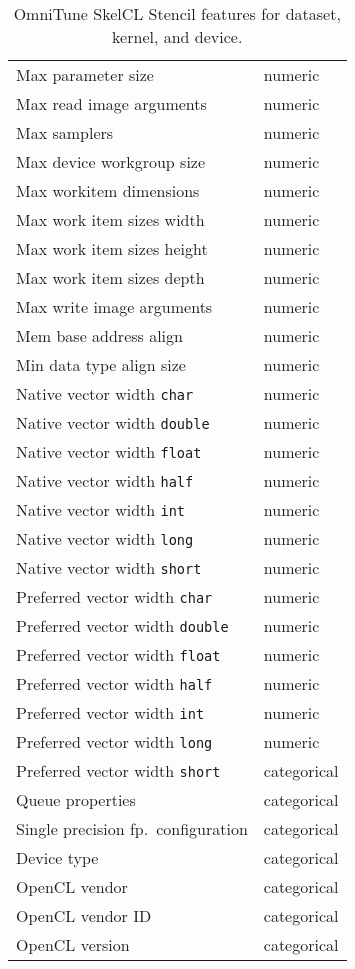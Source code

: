 \begin{table}
\begin{multicols}{2}
\begin{tabular}{p{4.5cm}p{1.3cm}}
      Max parameter size & numeric \\
      Max read image arguments & numeric \\
      Max samplers & numeric \\
      Max device workgroup size & numeric \\
      Max workitem dimensions & numeric \\
      Max work item sizes width & numeric \\
      Max work item sizes height & numeric \\
      Max work item sizes depth & numeric \\
      Max write image arguments & numeric \\
      Mem base address align & numeric \\
      Min data type align size & numeric \\
      Native vector width \texttt{char} & numeric \\
      Native vector width \texttt{double} & numeric \\
      Native vector width \texttt{float} & numeric \\
      Native vector width \texttt{half} & numeric \\
      Native vector width \texttt{int} & numeric \\
      Native vector width \texttt{long} & numeric \\
      Native vector width \texttt{short} & numeric \\
      Preferred vector width \texttt{char} & numeric \\
      Preferred vector width \texttt{double} & numeric \\
      Preferred vector width \texttt{float} & numeric \\
      Preferred vector width \texttt{half} & numeric \\
      Preferred vector width \texttt{int} & numeric \\
      Preferred vector width \texttt{long} & numeric \\
      Preferred vector width \texttt{short} & categorical \\
      Queue properties & categorical \\
      Single precision fp.\ configuration & categorical \\
      Device type & categorical \\
      OpenCL vendor & categorical \\
      OpenCL vendor ID & categorical \\
      OpenCL version & categorical \\
      \bottomrule
    \end{tabular}
  \end{multicols}
  \caption[OmniTune SkelCL Stencil features]{%
  OmniTune SkelCL Stencil features for dataset, kernel, and device.%
  }
  \label{tab:features}
\end{table}


